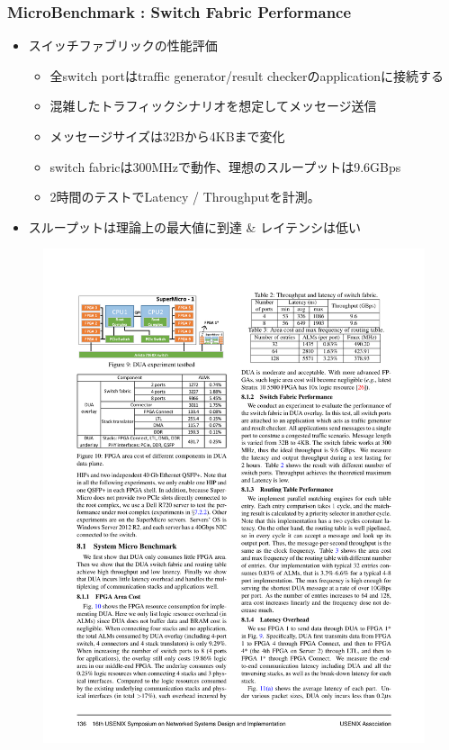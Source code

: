 \documentclass[dvipdfmx,9pt,notheorems]{beamer}
\theoremstyle{definition}
\begin{document}
\begin{frame}\frametitle{MicroBenchmark : Switch Fabric Performance}
	\begin{itemize}
			\item スイッチファブリックの性能評価
				\begin{itemize}
    			\item 全switch portはtraffic generator/result checkerのapplicationに接続する
    			\item 混雑したトラフィックシナリオを想定してメッセージ送信
    			\item メッセージサイズは32Bから4KBまで変化
    			\item switch fabricは300MHzで動作、理想のスループットは9.6GBps
    			\item 2時間のテストでLatency / Throughputを計測。
				\end{itemize}
			\item スループットは理論上の最大値に到達 \& レイテンシは低い
	\end{itemize}
  \begin{figure}[htb]
		\includegraphics[scale=1.0]{fig/table2.pdf}
  \end{figure}
\pnote{
}
\end{frame}
\end{document}

